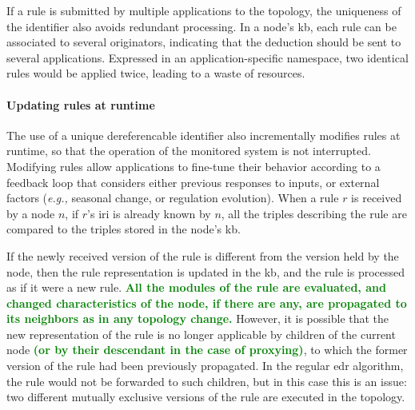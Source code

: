 \documentclass{iosart2c}
\newcommand{\added}[1]{\textcolor{green}{\textbf{#1}}}
\begin{document}
If a rule is submitted by multiple applications to the topology, the uniqueness of the identifier also avoids redundant processing.
In a node's \gls{kb}, each rule can be associated to several originators, indicating that the deduction should be sent to several applications.
Expressed in an application-specific namespace, two identical rules would be applied twice, leading to a waste of resources.

\paragraph{Updating rules at runtime} 

The use of a unique dereferencable identifier also incrementally modifies rules at runtime, so that the operation of the monitored system is not interrupted.
Modifying rules allow applications to fine-tune their behavior according to a feedback loop that considers either previous responses to inputs, or external factors (\textit{e.g.,} seasonal change, or regulation evolution).
When a rule $r$ is received by a node $n$, if $r$'s \gls{iri} is already known by $n$, all the triples describing the rule are compared to the triples stored in the node's \gls{kb}.

If the newly received version of the rule is different from the version held by the node, then the rule representation is updated in the \gls{kb}, and the rule is processed as if it were a new rule.
\added{All the modules of the rule are evaluated, and changed characteristics of the node, if there are any, are propagated to its neighbors as in any topology change.}
However, it is possible that the new representation of the rule is no longer applicable by children of the current node \added{(or by their descendant in the case of proxying)}, to which the former version of the rule had been previously propagated.
In the regular \gls{edr} algorithm, the rule would not be forwarded to such children, but in this case this is an issue: two different mutually exclusive versions of the rule are executed in the topology.
\end{document}
